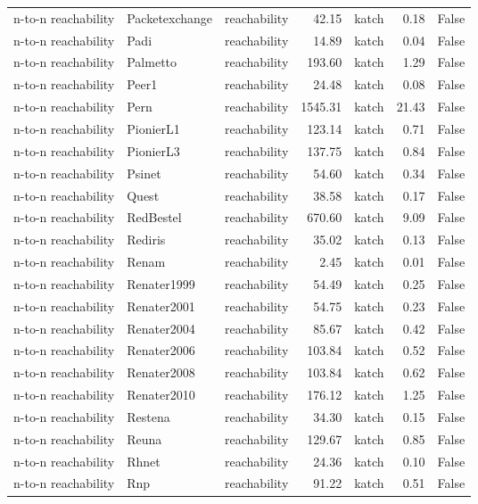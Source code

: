 \begin{tabular}{lllrlrr}
n-to-n reachability & Packetexchange & reachability & 42.15 & katch & 0.18 & False \\
n-to-n reachability & Padi & reachability & 14.89 & katch & 0.04 & False \\
n-to-n reachability & Palmetto & reachability & 193.60 & katch & 1.29 & False \\
n-to-n reachability & Peer1 & reachability & 24.48 & katch & 0.08 & False \\
n-to-n reachability & Pern & reachability & 1545.31 & katch & 21.43 & False \\
n-to-n reachability & PionierL1 & reachability & 123.14 & katch & 0.71 & False \\
n-to-n reachability & PionierL3 & reachability & 137.75 & katch & 0.84 & False \\
n-to-n reachability & Psinet & reachability & 54.60 & katch & 0.34 & False \\
n-to-n reachability & Quest & reachability & 38.58 & katch & 0.17 & False \\
n-to-n reachability & RedBestel & reachability & 670.60 & katch & 9.09 & False \\
n-to-n reachability & Rediris & reachability & 35.02 & katch & 0.13 & False \\
n-to-n reachability & Renam & reachability & 2.45 & katch & 0.01 & False \\
n-to-n reachability & Renater1999 & reachability & 54.49 & katch & 0.25 & False \\
n-to-n reachability & Renater2001 & reachability & 54.75 & katch & 0.23 & False \\
n-to-n reachability & Renater2004 & reachability & 85.67 & katch & 0.42 & False \\
n-to-n reachability & Renater2006 & reachability & 103.84 & katch & 0.52 & False \\
n-to-n reachability & Renater2008 & reachability & 103.84 & katch & 0.62 & False \\
n-to-n reachability & Renater2010 & reachability & 176.12 & katch & 1.25 & False \\
n-to-n reachability & Restena & reachability & 34.30 & katch & 0.15 & False \\
n-to-n reachability & Reuna & reachability & 129.67 & katch & 0.85 & False \\
n-to-n reachability & Rhnet & reachability & 24.36 & katch & 0.10 & False \\
n-to-n reachability & Rnp & reachability & 91.22 & katch & 0.51 & False \\

\end{tabular}
